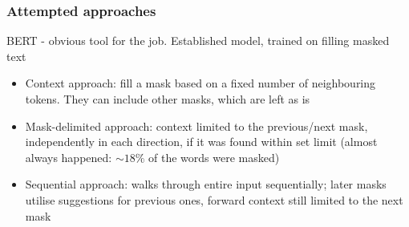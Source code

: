 \documentclass[../main.tex]{subfiles}
\begin{document}
\begin{frame}
	\frametitle{Attempted approaches}
	BERT - obvious tool for the job. Established model, trained on filling masked text
	\begin{itemize}
	\item
	Context approach: fill a mask based on a fixed number of neighbouring tokens.
	They can include other masks, which are left as is
	\item
	Mask-delimited approach:  context limited to the previous/next mask,
	independently in each direction, if it was found within set limit
	(almost always happened: $\sim18\%$ of the words were masked)
	\item
	Sequential approach: walks through entire input sequentially; later masks
	utilise suggestions for previous ones, forward context still limited to
	the next mask
	\end{itemize}
\end{frame}
\end{document}
